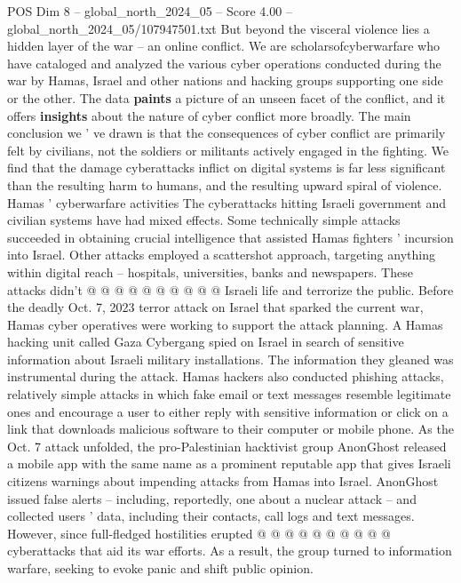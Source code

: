 \begin{textsample}{POS Dim 8 – global\_north\_2024\_05 – Score 4.00 – global\_north\_2024\_05/107947501.txt}  \label{ex:f8_pos_176}
But beyond the visceral violence lies a hidden layer of the war -- an online conflict.
We are scholarsofcyberwarfare who have cataloged and analyzed the various cyber operations conducted during the war by Hamas, Israel and other nations and hacking groups supporting one side or the other.
The data \textbf{paints} a picture of an unseen facet of the conflict, and it offers \textbf{insights} about the nature of cyber conflict more broadly.
The main conclusion we ' ve drawn is that the consequences of cyber conflict are primarily felt by civilians, not the soldiers or militants actively engaged in the fighting.
We find that the damage cyberattacks inflict on digital systems is far less significant than the resulting harm to humans, and the resulting upward spiral of violence.
Hamas ' cyberwarfare activities The cyberattacks hitting Israeli government and civilian systems have had mixed effects.
Some technically simple attacks succeeded in obtaining crucial intelligence that assisted Hamas fighters ' incursion into Israel.
Other attacks employed a scattershot approach, targeting anything within digital reach -- hospitals, universities, banks and newspapers.
These attacks didn't @ @ @ @ @ @ @ @ @ @ Israeli life and terrorize the public.
Before the deadly Oct. 7, 2023 terror attack on Israel that sparked the current war, Hamas cyber operatives were working to support the attack planning.
A Hamas hacking unit called Gaza Cybergang spied on Israel in search of sensitive information about Israeli military installations.
The information they gleaned was instrumental during the attack.
Hamas hackers also conducted phishing attacks, relatively simple attacks in which fake email or text messages resemble legitimate ones and encourage a user to either reply with sensitive information or click on a link that downloads malicious software to their computer or mobile phone.
As the Oct. 7 attack unfolded, the pro-Palestinian hacktivist group AnonGhost released a mobile app with the same name as a prominent reputable app that gives Israeli citizens warnings about impending attacks from Hamas into Israel.
AnonGhost issued false alerts -- including, reportedly, one about a nuclear attack -- and collected users ' data, including their contacts, call logs and text messages.
However, since full-fledged hostilities erupted @ @ @ @ @ @ @ @ @ @ cyberattacks that aid its war efforts.
As a result, the group turned to information warfare, seeking to evoke panic and shift public opinion.

\end{textsample}
